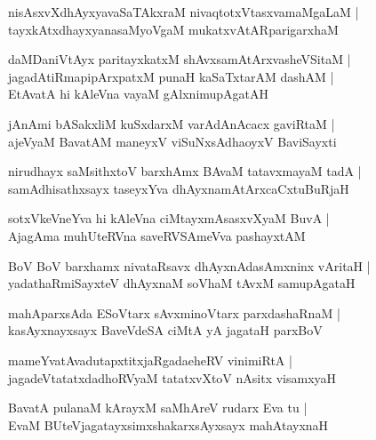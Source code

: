\begin{shloka}
nisAsxvXdhAyxyavaSaTAkxraM nivaqtotxVtasxvamaMgaLaM |\\
tayxkAtxdhayxyanasaMyoVgaM mukatxvAtARparigarxhaM
\end{shloka}

\begin{shloka}
daMDaniVtAyx paritayxkatxM shAvxsamAtArxvasheVSitaM |\\
jagadAtiRmapipArxpatxM punaH kaSaTxtarAM dashAM |\\
EtAvatA hi kAleVna vayaM gAlxnimupAgatAH
\end{shloka}

\begin{shloka}
jAnAmi bASakxliM kuSxdarxM varAdAnAcacx gaviRtaM |\\
ajeVyaM BavatAM maneyxV viSuNxsAdhaoyxV BaviSayxti
\end{shloka}

\begin{shloka}
nirudhayx saMsithxtoV barxhAmx BAvaM tatavxmayaM tadA |\\
samAdhisathxsayx taseyxYva dhAyxnamAtArxcaCxtuBuRjaH
\end{shloka}

\begin{shloka}
sotxVkeVneYva hi kAleVna ciMtayxmAsasxvXyaM BuvA |\\
AjagAma muhUteRVna saveRVSAmeVva pashayxtAM
\end{shloka}

\begin{shloka}
BoV BoV barxhamx nivataRsavx dhAyxnAdasAmxninx vAritaH |\\
yadathaRmiSayxteV dhAyxnaM soVhaM tAvxM samupAgataH 
\end{shloka}

\begin{shloka}
mahAparxsAda ESoVtarx sAvxminoVtarx parxdashaRnaM |\\
kasAyxnayxsayx BaveVdeSA ciMtA yA jagataH parxBoV
\end{shloka}

\begin{shloka}
mameYvatAvadutapxtitxjaRgadaeheRV vinimiRtA |\\
jagadeVtatatxdadhoRVyaM tatatxvXtoV nAsitx visamxyaH
\end{shloka}

\begin{shloka}
BavatA pulanaM kArayxM saMhAreV rudarx Eva tu |\\
EvaM BUteVjagatayxsimx\R shakarxsAyxsayx mahAtayxnaH
\end{shloka}

